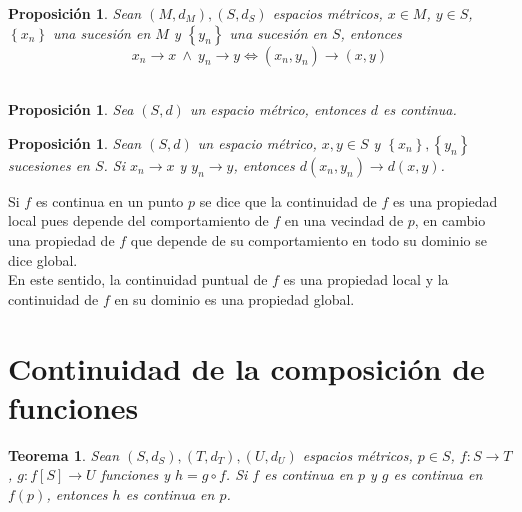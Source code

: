 \documentclass[oneside]{book} %
\theoremstyle{Teorema}
\newtheorem{Teorema}[Definicion]{Teorema}
\newtheorem{Proposicion}[Definicion]{Proposición}
\theoremstyle{Ejemplos}
\theoremstyle{[Obs]}
\renewcommand{\{}{\left\lbrace} %
\renewcommand{\}}{\right\rbrace} %
\newcommand{\y}{\ \wedge\ } %
\begin{document}
			\begin{Proposicion}
				
				Sean $(M, d_M), (S, d_S)$ espacios métricos, $x \in M$, $y \in S$, $\{ x_n \}$ una sucesión en $M$ y $\{ y_n \}$ una sucesión en $S$, entonces \\

				\[ x_n \to x \y y_n \to y \Leftrightarrow (x_n, y_n) \to (x, y) \] \\

			\end{Proposicion}

			\begin{Proposicion}
				
				Sea $(S, d)$ un espacio métrico, entonces $d$ es continua. \\

			\end{Proposicion}

			\begin{Proposicion}
				
				Sean $(S, d)$ un espacio métrico, $x, y \in S$ y $\{ x_n \}, \{ y_n \}$ sucesiones en $S$. Si $x_n \to x$ y $y_n \to y$, entonces $d(x_n, y_n) \to d(x, y)$. \\

			\end{Proposicion}

			Si $f$ es continua en un punto $p$ se dice que la continuidad de $f$ es una propiedad local pues depende del comportamiento de $f$ en una vecindad de $p$, en cambio una propiedad de $f$ que depende de su comportamiento en todo su dominio se dice global. \\

			En este sentido, la continuidad puntual de $f$ es una propiedad local y la continuidad de $f$ en su dominio es una propiedad global. \\

		\section{Continuidad de la composición de funciones}

			\begin{Teorema}
				
				Sean $(S, d_S), (T, d_T), (U, d_U)$ espacios métricos, $p \in S$, $f : S \to T$, $g : f[S] \to U$ funciones y $h = g \circ f$. Si $f$ es continua en $p$ y $g$ es continua en $f(p)$, entonces $h$ es continua en $p$. \\

			\end{Teorema}
\end{document}
